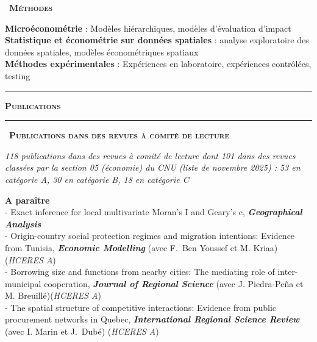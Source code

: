 \documentclass[a4paper,12pt]{article}
\newcommand{\titre}[1]{%
	\bigskip
	\noindent \rule[2mm]{\textwidth}{0.5pt}
	\textbf{\textsc{\large #1}} \\
	\noindent \rule[1mm]{\textwidth}{0.5pt}
	}
\newcommand{\smalltitre}[1]{%
	\noindent \textbullet~\textsc{\textbf{#1}}
	\smallskip
	}
\begin{document}
\smalltitre{Méthodes} \smallskip

\noindent \textbf{Microéconométrie} : Modèles hiérarchiques, modèles d'évaluation d'impact \smallskip \\ 
\textbf{Statistique et économétrie sur données spatiales} : analyse exploratoire des données spatiales, modèles économétriques spatiaux \smallskip \\ 
\textbf{Méthodes expérimentales} : Expériences en laboratoire, expériences contrôlées, testing \smallskip \\ 


\titre{Publications}


\smalltitre{Publications dans des revues à comité de lecture} \medskip

\noindent \textit{118 publications dans des revues à comité de lecture dont 101 dans des revues classées par la section 05 (économie) du CNU (liste de novembre 2025) : 53 en catégorie A, 30 en catégorie B, 18 en catégorie C} \medskip

\noindent \textbf{A paraître}  \smallskip \\
- Exact inference for local multivariate Moran's I and Geary's c, \textit{\textbf{Geographical Analysis}} \\
- Origin-country social protection regimes and migration intentions: Evidence from Tunisia, \textit{\textbf{Economic Modelling}} (avec F.~Ben Youssef et M. Kriaa) (\textit{HCERES A}) \\
- Borrowing size and functions from nearby cities: The mediating role of inter-municipal cooperation, \textit{\textbf{Journal of Regional Science}} (avec J. Piedra-Peña et M. Breuillé)(\textit{HCERES A}) \\
- The spatial structure of competitive interactions: Evidence from public procurement networks in Quebec, \textit{\textbf{International Regional Science Review}} (avec I. Marin et J.~Dubé) (\textit{HCERES A})\\
\end{document}
